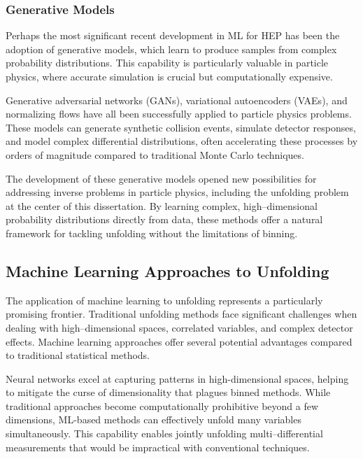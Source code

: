 \subsubsection{Generative Models}
Perhaps the most significant recent development in ML for HEP has been the adoption of generative models, which learn to produce samples from complex probability distributions.
%
This capability is particularly valuable in particle physics, where accurate simulation is crucial but computationally expensive.

Generative adversarial networks (GANs), variational autoencoders (VAEs), and normalizing flows have all been successfully applied to particle physics problems. These models can generate synthetic collision events, simulate detector responses\kd{}, and model complex differential distributions,\kd{} often accelerating these processes by orders of magnitude compared to traditional Monte Carlo techniques.

The development of these generative models opened new possibilities for addressing inverse problems in particle physics, including the unfolding problem at the center of this dissertation.
%
By learning complex, high--dimensional probability distributions directly from data, these methods offer a natural framework for tackling unfolding without the limitations of binning.

\subsection{Machine Learning Approaches to Unfolding}

The application of machine learning to unfolding represents a particularly promising frontier.
%
Traditional unfolding methods face significant challenges when dealing with high--dimensional spaces, correlated variables, and complex detector effects.
%
Machine learning approaches offer several potential advantages compared to traditional statistical methods.

Neural networks excel at capturing patterns in high-dimensional spaces, helping to mitigate the curse of dimensionality that plagues binned methods.
%
While traditional approaches become computationally prohibitive beyond a few dimensions, ML-based methods can effectively unfold many variables simultaneously.\kd{}
%
This capability enables jointly unfolding multi--differential measurements that would be impractical with conventional techniques.

